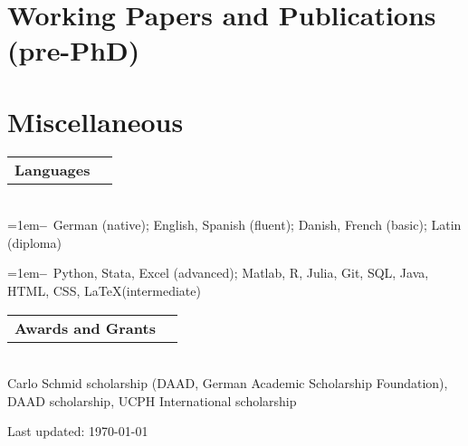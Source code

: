 \documentclass[a4paper,11pt]{article}
\makeatletter
\newcommand{\Subheading}[4]{   
    \vspace{7pt}
    \begin{tabular*}{\textwidth}[t]{@{}l@{\extracolsep{\fill}}r@{}}
        \textbf{#1}\textit{\small #2} & {\footnotesize #3} \\
    \end{tabular*}
    {\small #4}
}
\newcommand{\myitem}[1]{\hangindent=1em\hangafter=1\textbf{--}~#1\par}
\makeatother
\begin{document}
\newpage

\section{Working Papers and Publications (pre-PhD)}
\setlength{\bibitemsep}{1.4ex}
\begin{refsection}
\nocite{*}
\printbibliography[heading=none]
\end{refsection}

\section{Miscellaneous}

\Subheading
    {Languages}{}{}
    {\\
    \myitem{German (native); English, Spanish (fluent); Danish, French (basic); Latin (diploma)}
    \myitem{Python, Stata, Excel (advanced); Matlab, R, Julia, Git, SQL, Java, HTML, CSS, \LaTeX\space(intermediate)}
    }

\Subheading
    {Awards and Grants}{}{}
    {\\
    Carlo Schmid scholarship (DAAD, German Academic Scholarship Foundation), DAAD scholarship, UCPH International scholarship
    } 

\vfill
\begin{center}
{\footnotesize Last updated: \today}
\end{center}
\end{document}
